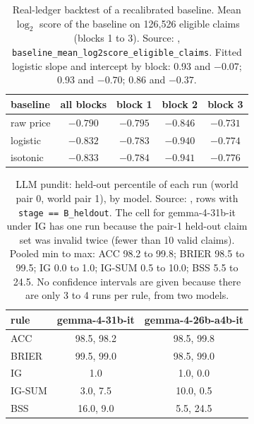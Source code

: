 \documentclass[10pt]{article}
\begin{document}
\begin{table}[!ht]
\centering\small
\caption{Real-ledger backtest of a recalibrated baseline. Mean $\log_2$ score of the baseline on 126,526 eligible claims (blocks 1 to 3). Source: , \texttt{baseline\_mean\_log2score\_eligible\_claims}. Fitted logistic slope and intercept by block: 0.93 and $-0.07$; 0.93 and $-0.70$; 0.86 and $-0.37$.}
\label{tab:A6}
\begin{tabular}{@{}lcccc@{}}
\toprule
baseline & all blocks & block 1 & block 2 & block 3 \\
\midrule
raw price & $-0.790$ & $-0.795$ & $-0.846$ & $-0.731$ \\
logistic & $-0.832$ & $-0.783$ & $-0.940$ & $-0.774$ \\
isotonic & $-0.833$ & $-0.784$ & $-0.941$ & $-0.776$ \\
\bottomrule
\end{tabular}
\end{table}

\begin{table}[!ht]
\centering\small
\caption{LLM pundit: held-out percentile of each run (world pair 0, world pair 1), by model. Source: , rows with \texttt{stage == B\_heldout}. The cell for gemma-4-31b-it under IG has one run because the pair-1 held-out claim set was invalid twice (fewer than 10 valid claims). Pooled min to max: ACC 98.2 to 99.8; BRIER 98.5 to 99.5; IG 0.0 to 1.0; IG-SUM 0.5 to 10.0; BSS 5.5 to 24.5. No confidence intervals are given because there are only 3 to 4 runs per rule, from two models.}
\label{tab:A7}
\begin{tabular}{@{}lcc@{}}
\toprule
rule & gemma-4-31b-it & gemma-4-26b-a4b-it \\
\midrule
ACC & 98.5, 98.2 & 98.5, 99.8 \\
BRIER & 99.5, 99.0 & 98.5, 99.0 \\
IG & 1.0 & 1.0, 0.0 \\
IG-SUM & 3.0, 7.5 & 10.0, 0.5 \\
BSS & 16.0, 9.0 & 5.5, 24.5 \\
\bottomrule
\end{tabular}
\end{table}
\end{document}
